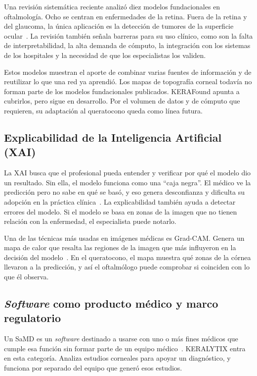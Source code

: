         Una revisión sistemática reciente analizó diez modelos fundacionales en oftalmología. Ocho se centran en enfermedades de la retina. Fuera de la retina y del glaucoma, la única aplicación es la detección de tumores de la superficie ocular~\cite{jin_fm_oftalmologia}. La revisión también señala barreras para su uso clínico, como son la falta de interpretabilidad, la alta demanda de cómputo, la integración con los sistemas de los hospitales y la necesidad de que los especialistas los validen.

        Estos modelos muestran el aporte de combinar varias fuentes de información y de reutilizar lo que una red ya aprendió. Los mapas de topografía corneal todavía no forman parte de los modelos fundacionales publicados. KERAFound apunta a cubrirlos, pero sigue en desarrollo. Por el volumen de datos y de cómputo que requieren, su adaptación al queratocono queda como línea futura.

    \subsection{Explicabilidad de la Inteligencia Artificial (XAI)}

        La XAI busca que el profesional pueda entender y verificar por qué el modelo dio un resultado. Sin ella, el modelo funciona como una ``caja negra''. El médico ve la predicción pero no sabe en qué se basó, y eso genera desconfianza y dificulta su adopción en la práctica clínica~\cite{jin_fm_oftalmologia}. La explicabilidad también ayuda a detectar errores del modelo. Si el modelo se basa en zonas de la imagen que no tienen relación con la enfermedad, el especialista puede notarlo.

        Una de las técnicas más usadas en imágenes médicas es Grad-CAM. Genera un mapa de calor que resalta las regiones de la imagen que más influyeron en la decisión del modelo~\cite{gradcam}. En el queratocono, el mapa muestra qué zonas de la córnea llevaron a la predicción, y así el oftalmólogo puede comprobar si coinciden con lo que él observa.

    \subsection{\textit{Software} como producto médico y marco regulatorio}

        Un SaMD es un \textit{software} destinado a usarse con uno o más fines médicos que cumple esa función sin formar parte de un equipo médico~\cite{imdrf_samd}. KERALYTIX entra en esta categoría. Analiza estudios corneales para apoyar un diagnóstico, y funciona por separado del equipo que generó esos estudios.

